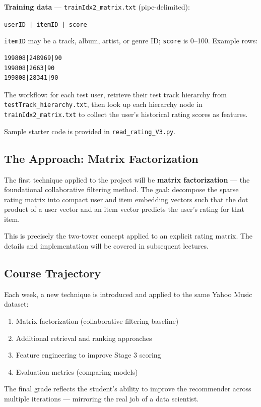 \documentclass[11pt]{article}
\begin{document}
\textbf{Training data} --- \texttt{trainIdx2\_matrix.txt} (pipe-delimited):
\begin{center}
\texttt{userID | itemID | score}
\end{center}
\texttt{itemID} may be a track, album, artist, or genre ID; \texttt{score}
is 0--100.
Example rows:
\begin{verbatim}
199808|248969|90
199808|2663|90
199808|28341|90
\end{verbatim}

The workflow: for each test user, retrieve their test track hierarchy from
\texttt{testTrack\_hierarchy.txt}, then look up each hierarchy node in
\texttt{trainIdx2\_matrix.txt} to collect the user's historical rating
scores as features.

Sample starter code is provided in \texttt{read\_rating\_V3.py}.

\subsection{The Approach: Matrix Factorization}
The first technique applied to the project will be
\textbf{matrix factorization} --- the foundational collaborative filtering
method. The goal: decompose the sparse rating matrix into compact user and
item embedding vectors such that the dot product of a user vector and an
item vector predicts the user's rating for that item.

This is precisely the two-tower concept applied to an explicit rating
matrix. The details and implementation will be covered in subsequent
lectures.

\subsection{Course Trajectory}
Each week, a new technique is introduced and applied to the same Yahoo
Music dataset:
\begin{enumerate}
    \item Matrix factorization (collaborative filtering baseline)
    \item Additional retrieval and ranking approaches
    \item Feature engineering to improve Stage 3 scoring
    \item Evaluation metrics (comparing models)
\end{enumerate}
The final grade reflects the student's ability to improve the recommender
across multiple iterations --- mirroring the real job of a data scientist.
\end{document}

